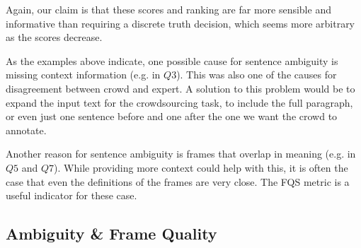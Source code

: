 Again, our claim is that these scores and ranking are far more sensible and informative than requiring a discrete truth decision, which seems more arbitrary as the scores decrease.

As the examples above indicate, one possible cause for sentence ambiguity is missing context information (e.g. in $Q3$). This was also one of the causes for disagreement between crowd and expert. A solution to this problem would be to expand the input text for the crowdsourcing task, to include the full paragraph, or even just one sentence before and one after the one we want the crowd to annotate.

Another reason for sentence ambiguity is frames that overlap in meaning (e.g. in $Q5$ and $Q7$). While providing more context could help with this, it is often the case that even the definitions of the frames are very close. The FQS metric is a useful indicator for these case.

\subsection{Ambiguity \& Frame Quality}


